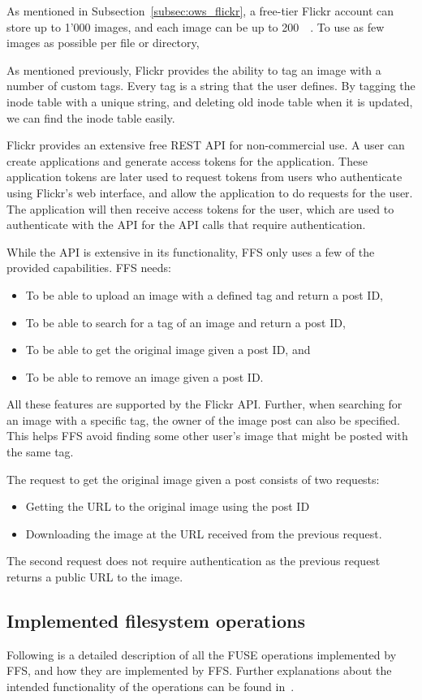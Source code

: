 As mentioned in Subsection~\ref{subsec:ows_flickr}, a free-tier Flickr account can store up to 1'000 images, and each image can be up to \SI{200}{\mega\byte}. To use as few images as possible per file or directory, 

As mentioned previously, Flickr provides the ability to tag an image with a number of custom tags. Every tag is a string that the user defines. By tagging the inode table with a unique string, and deleting old inode table when it is updated, we can find the inode table easily. 

Flickr provides an extensive free REST API for non-commercial use. A user can create applications and generate access tokens for the application. These application tokens are later used to request tokens from users who authenticate using Flickr's web interface, and allow the application to do requests for the user. The application will then receive access tokens for the user, which are used to authenticate with the API for the API calls that require authentication.

While the API is extensive in its functionality, FFS only uses a few of the provided capabilities. FFS needs:
\begin{itemize}
	\item To be able to upload an image with a defined tag and return a post ID,
	\item To be able to search for a tag of an image and return a post ID,
	\item To be able to get the original image given a post ID, and
	\item To be able to remove an image given a post ID.
\end{itemize}
All these features are supported by the Flickr API. Further, when searching for an image with a specific tag, the owner of the image post can also be specified. This helps FFS avoid finding some other user's image that might be posted with the same tag. 

The request to get the original image given a post consists of two requests:
\begin{itemize}
	\item Getting the URL to the original image using the post ID
	\item Downloading the image at the URL received from the previous request.
\end{itemize}
The second request does not require authentication as the previous request returns a public URL to the image. 

\subsection{Implemented filesystem operations}
\label{subsec:file_op}
Following is a detailed description of all the FUSE operations implemented by FFS, and how they are implemented by FFS. Further explanations about the intended functionality of the operations can be found in \,\cite{kuenningCS135FUSEDocumentation2010}. 

